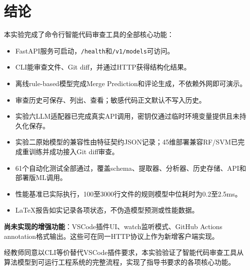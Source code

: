 \documentclass{experimentreport}
\begin{document}
\section{结论}

本实验完成了命令行智能代码审查工具的全部核心功能：

\begin{itemize}
  \item FastAPI服务可启动，\texttt{/health}和\texttt{/v1/models}可访问。
  \item CLI能审查文件、Git diff，并通过HTTP获得结构化结果。
  \item 离线rule-based模型完成Merge Prediction和评论生成，不依赖外网即可演示。
  \item 审查历史可保存、列出、查看；敏感代码正文默认不写入历史。
  \item 实验六LLM适配器已完成真实API调用，密钥仅通过临时环境变量提供且未持久化保存。
  \item 实验二原始模型的兼容性由特征契约JSON记录；45维部署兼容RF/SVM已完成重训练并成功接入Git diff审查。
  \item 61个自动化测试全部通过，覆盖schema、提取器、分析器、历史存储、API和部署版ML调用。
  \item 性能基准已实际执行，100至3000行文件的规则模型中位耗时为0.2至2.5ms。
  \item LaTeX报告如实记录各项状态，不伪造模型预测或性能数据。
\end{itemize}

\textbf{尚未实现的增强功能}：VSCode插件UI、watch监听模式、GitHub Actions annotation格式输出。这些可在同一HTTP协议上作为新增客户端实现。

经教师同意以CLI等价替代VSCode插件要求，本实验验证了智能代码审查工具从算法模型到可运行工程系统的完整流程，实现了指导书要求的各项核心功能。
\end{document}
